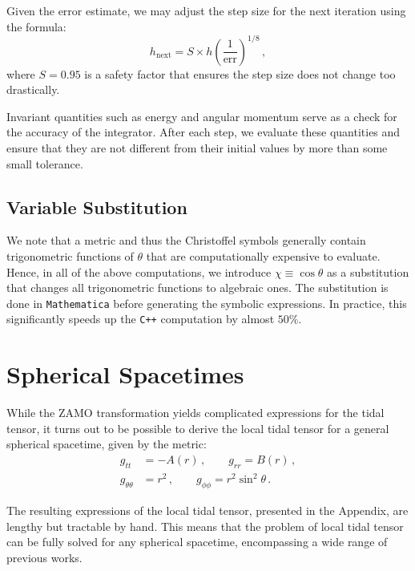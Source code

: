 \documentclass[11pt, twocolumn]{article}
\begin{document}
Given the error estimate, we may adjust the step size for the next iteration using the formula:
\begin{equation}
    h_{\text{next}} = S \times h \left( \frac{1}{\text{err}} \right)^{1/8} \, ,
\end{equation}
where $S=0.95$ is a safety factor that ensures the step size does not change too drastically.

Invariant quantities such as energy and angular momentum serve as a check for the accuracy of the integrator. After each step, we evaluate these quantities and ensure that they are not different from their initial values by more than some small tolerance.

\subsection{Variable Substitution}


We note that a metric and thus the Christoffel symbols generally contain trigonometric functions of $\theta$ that are computationally expensive to evaluate. Hence, in all of the above computations, we introduce $\chi \equiv \cos{\theta}$ as a substitution that changes all trigonometric functions to algebraic ones. The substitution is done in \texttt{Mathematica} before generating the symbolic expressions. In practice, this significantly speeds up the \texttt{C++} computation by almost $50\%$.


\section{Spherical Spacetimes} \label{sec:spherical}


While the ZAMO transformation yields complicated expressions for the tidal tensor, it turns out to be possible to derive the local tidal tensor for a general spherical spacetime, given by the metric:
\begin{equation}
    \begin{split}
        g_{tt} &= -A(r) \, , \qquad g_{rr} = B(r) \, , \\
        g_{\theta\theta} &= r^{2} \, , \qquad g_{\phi\phi} = r^{2} \sin^{2}{\theta} \, .
    \end{split}
    \label{eq:spherical_metric}
\end{equation}

The resulting expressions of the local tidal tensor, presented in the Appendix, are lengthy but tractable by hand. This means that the problem of local tidal tensor can be fully solved for any spherical spacetime, encompassing a wide range of previous works.
\end{document}
